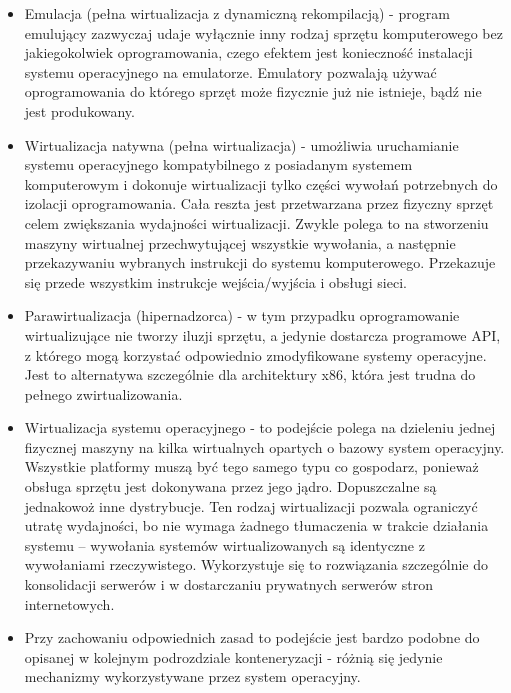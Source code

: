 \documentclass[10pt,a4paper,titlepage,twoside]{report}
\begin{document}
\begin{itemize}
	\item Emulacja (pełna wirtualizacja z dynamiczną rekompilacją) - program emulujący zazwyczaj udaje wyłącznie inny rodzaj sprzętu komputerowego bez jakiegokolwiek oprogramowania, czego efektem jest konieczność instalacji systemu operacyjnego na emulatorze. Emulatory pozwalają używać oprogramowania do którego sprzęt może fizycznie już nie istnieje, bądź nie jest produkowany.
	\item Wirtualizacja natywna (pełna wirtualizacja) - umożliwia uruchamianie systemu operacyjnego kompatybilnego z posiadanym systemem komputerowym i dokonuje wirtualizacji tylko części wywołań potrzebnych do izolacji oprogramowania. Cała reszta jest przetwarzana przez fizyczny sprzęt celem zwiększania wydajności wirtualizacji. Zwykle polega to na stworzeniu maszyny wirtualnej przechwytującej wszystkie wywołania, a następnie przekazywaniu wybranych instrukcji do systemu komputerowego. Przekazuje się przede wszystkim instrukcje wejścia/wyjścia i obsługi sieci.
	\item Parawirtualizacja (hipernadzorca) - w tym przypadku oprogramowanie wirtualizujące nie tworzy iluzji sprzętu, a jedynie dostarcza programowe API, z którego mogą korzystać odpowiednio zmodyfikowane systemy operacyjne. Jest to alternatywa szczególnie dla architektury x86, która jest trudna do pełnego zwirtualizowania.
	\item Wirtualizacja systemu operacyjnego - to podejście polega na dzieleniu jednej fizycznej maszyny na kilka wirtualnych opartych o bazowy system operacyjny. Wszystkie platformy muszą być tego samego typu co gospodarz, ponieważ obsługa sprzętu jest dokonywana przez jego jądro. Dopuszczalne są jednakowoż inne dystrybucje. Ten rodzaj wirtualizacji pozwala ograniczyć utratę wydajności, bo nie wymaga żadnego tłumaczenia w trakcie działania systemu – wywołania systemów wirtualizowanych są identyczne z wywołaniami rzeczywistego. Wykorzystuje się to rozwiązania szczególnie do konsolidacji serwerów i w dostarczaniu prywatnych serwerów stron internetowych.
	\item Przy zachowaniu odpowiednich zasad to podejście jest bardzo podobne do opisanej w kolejnym podrozdziale konteneryzacji - różnią się jedynie mechanizmy wykorzystywane przez system operacyjny.
\end{itemize}
\end{document}

